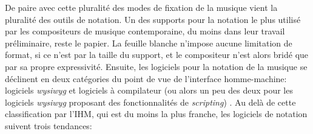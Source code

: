 De paire avec cette pluralité des modes de fixation de la musique vient la pluralité des outils de notation. 
Un des supports pour la notation le plus utilisé par les compositeurs de musique contemporaine, du moins dans leur travail préliminaire, reste le papier. La feuille blanche n'impose aucune limitation de format, si ce n'est par la taille du support, et le compositeur n'est alors bridé que par sa propre expressivité.
Ensuite, les logiciels pour la notation de la musique se déclinent en deux catégories du point de vue de l'interface homme-machine: logiciels \textit{wysiwyg} et logiciels à compilateur (ou alors un peu des deux pour les logiciels \textit{wysiwyg} proposant des fonctionnalités de \textit{scripting}) \cite{fober2015}.
Au delà de cette classification par l'IHM, qui est du moins la plus franche, les logiciels de notation suivent trois tendances:
